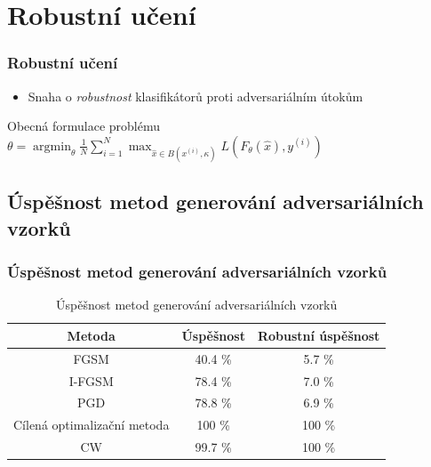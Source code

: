 \documentclass[czech]{beamer}
\begin{document}
\section{Robustní učení}

\begin{frame}
    \frametitle{Robustní učení}
    \begin{itemize}
        \item Snaha o \emph{robustnost} klasifikátorů proti adversariálním útokům
    \end{itemize}

    \begin{block}{Obecná formulace problému}
        \centering
        $\theta = \operatorname{argmin}_\theta \frac{1}{N} \sum_{i=1}^N  \operatorname{max}_{\hat{x} \in B(x^{(i)}, \kappa)} L\left(F_\theta(\hat{x}), y^{(i)}\right)$
    \end{block}
\end{frame}



\subsection{Úspěšnost metod generování adversariálních vzorků}

\begin{frame}
    \frametitle{Úspěšnost metod generování adversariálních vzorků}
    \begin{table}
        \centering
        \begin{tabular}{| c | c | c |}
            \hline
            Metoda & Úspěšnost & Robustní úspěšnost\\
            \hline
            FGSM & 40.4 \% & 5.7 \% \\
            I-FGSM & 78.4 \% & 7.0 \% \\
            PGD & 78.8 \% & 6.9 \% \\
            Cílená optimalizační metoda & 100 \% & 100 \% \\
            CW & 99.7 \% & 100 \% \\
            \hline
        \end{tabular}
        \caption{Úspěšnost metod generování adversariálních vzorků}
        \label{allgen_success}
    \end{table}
\end{frame}
\end{document}
